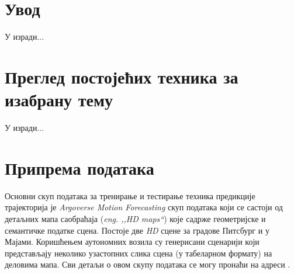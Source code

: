 \documentclass[11pt,oneside]{memoir}
\begin{document}
\frontmatter
\naslovna
\komisija
\apstrakt
\tableofcontents*

\mainmatter

\chapter{Увод}

У изради...

\chapter{Преглед постојећих техника за изабрану тему}
\label{chp:razrada}

У изради...

\chapter{Припрема података}

Основни скуп података за тренирање и тестирање техника предикције трајекторија је \textit{Argoverse Motion Forecasting} скуп података
који се састоји од детаљних мапа саобраћаја (\textit{eng. ,,HD maps``}) које садрже геометријске и семантичке податке сцена. Постоје две \textit{HD} сцене
за градове Питсбург и у Мајами. Коришћењем аутономних возила су генерисани сценарији који представљају неколико узастопних слика сцена (у табеларном формату)
на деловима мапа. Сви детаљи о овом скупу података се могу пронаћи на адреси 
\href{https://www.argoverse.org/index.html}{\color{blue}{www.argoverse.org}} \cite{argoverse}. \\
\end{document}
